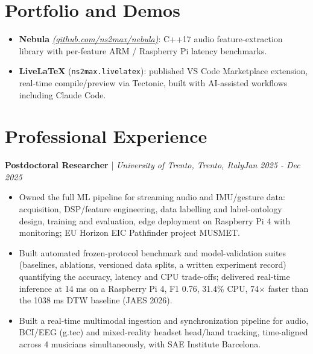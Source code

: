 \documentclass[11pt]{article}
\newenvironment{cvrole}[5]{%
  \par\noindent\textbf{\large #1} | \textit{\small #2, #3}\hfill \textit{\small #4 - #5}\par
  \begin{itemize}[leftmargin=2em, itemsep=-0.3em, topsep=-0.5em]%
}{%
  \end{itemize}\par\noindent\mbox{}\par\vspace{0.1em}%
}
\begin{document}
\section*{Portfolio and Demos \footnotesize {}}
\begin{itemize}[leftmargin=1.2em, itemsep=-0.25em]
    \item \textbf{Nebula} \href{https://github.com/ns2max/nebula}{\textit{(github.com/ns2max/nebula)}}: C++17 audio feature-extraction library with per-feature ARM / Raspberry Pi latency benchmarks.
    \item \textbf{LiveLaTeX} (\texttt{ns2max.livelatex}): published VS Code Marketplace extension, real-time compile/preview via Tectonic, built with AI-assisted workflows including Claude Code.
\end{itemize}

\section*{Professional Experience}

\begin{cvrole}{Postdoctoral Researcher}{University of Trento}{Trento, Italy}{Jan 2025}{Dec 2025}
    \item Owned the full ML pipeline for streaming audio and IMU/gesture data: acquisition, DSP/feature engineering, data labelling and label-ontology design, training and evaluation, edge deployment on Raspberry Pi 4 with monitoring; EU Horizon EIC Pathfinder project MUSMET.
    \item Built automated frozen-protocol benchmark and model-validation suites (baselines, ablations, versioned data splits, a written experiment record) quantifying the accuracy, latency and CPU trade-offs; delivered real-time inference at 14 ms on a Raspberry Pi 4, F1 0.76, 31.4\% CPU, 74$\times$ faster than the 1038 ms DTW baseline (JAES 2026).
    \item Built a real-time multimodal ingestion and synchronization pipeline for audio, BCI/EEG (g.tec) and mixed-reality headset head/hand tracking, time-aligned across 4 musicians simultaneously, with SAE Institute Barcelona.
\end{cvrole}
\end{document}

